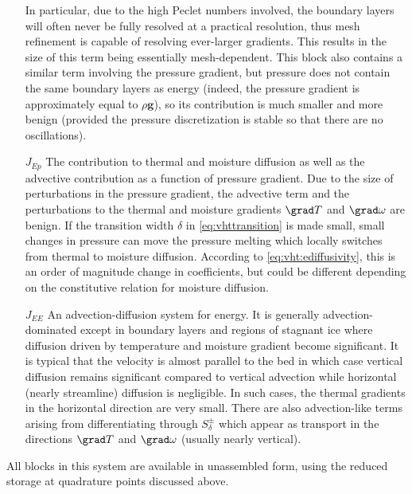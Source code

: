 \begin{itemize}
    In particular, due to the high Peclet numbers involved, the boundary layers will often never be fully resolved at a practical resolution, thus mesh refinement is capable of resolving ever-larger gradients.
    This results in the size of this term being essentially mesh-dependent.
    This block also contains a similar term involving the pressure gradient, but pressure does not contain the same boundary layers as energy (indeed, the pressure gradient is approximately equal to $\rho \bm g$), so its contribution is much smaller and more benign (provided the pressure discretization is stable so that there are no oscillations).
  \item[$J_{Ep}$] The contribution to thermal and moisture diffusion as well as the advective contribution as a function of pressure gradient.
    Due to the size of perturbations in the pressure gradient, the advective term and the perturbations to the thermal and moisture gradients $\grad T$ and $\grad \omega$ are benign.
    If the transition width $\delta$ in \eqref{eq:vhttransition} is made small, small changes in pressure can move the pressure melting which locally switches from thermal to moisture diffusion.
    According to \eqref{eq:vht:ediffusivity}, this is an order of magnitude change in coefficients, but could be different depending on the constitutive relation for moisture diffusion.
  \item[$J_{EE}$] An advection-diffusion system for energy.
    It is generally advection-dominated except in boundary layers and regions of stagnant ice where diffusion driven by temperature and moisture gradient become significant.
    It is typical that the velocity is almost parallel to the bed in which case vertical diffusion remains significant compared to vertical advection while horizontal (nearly streamline) diffusion is negligible.
    In such cases, the thermal gradients in the horizontal direction are very small.
    There are also advection-like terms arising from differentiating through $S^\pm_\delta$ which appear as transport in the directions $\grad T$ and $\grad \omega$ (usually nearly vertical).
\end{itemize}
All blocks in this system are available in unassembled form, using the reduced storage at quadrature points discussed above.

